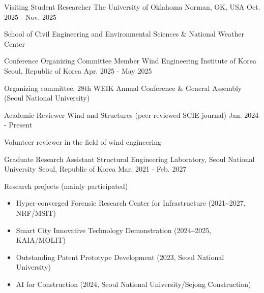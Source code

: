 

\begin{cventries}

  \cventrycompact
  {Visiting Student Researcher}
  {The University of Oklahoma}
  {Norman, OK, USA}
  {Oct. 2025 - Nov. 2025}
  {
    \begin{cvitems}
      \item {School of Civil Engineering and Environmental Sciences \& National Weather Center}
    \end{cvitems}
  }

  \cventrydivider

  \cventrycompact
  {Conference Organizing Committee Member}
  {Wind Engineering Institute of Korea}
  {Seoul, Republic of Korea}
  {Apr. 2025 - May 2025}
  {
    \begin{cvitems}
      \item {Organizing committee, 28th WEIK Annual Conference \& General Assembly (Seoul National University)}
    \end{cvitems}
  }

  \cventrydivider

  \cventrycompact
  {Academic Reviewer}
  {Wind and Structures (peer-reviewed SCIE journal)}
  {}
  {Jan. 2024 - Present}
  {
    \begin{cvitems}
      \item {Volunteer reviewer in the field of wind engineering}
    \end{cvitems}
  }

  \cventrydivider

  \cventrycompact
  {Graduate Research Assistant}
  {Structural Engineering Laboratory, Seoul National University}
  {Seoul, Republic of Korea}
  {Mar. 2021 - Feb. 2027}
  {
    \begin{cvitems}
      \item {Research projects (mainly participated)}
        \begin{itemize}[leftmargin=2.5ex, nosep, noitemsep]
          \setlength{\parskip}{0pt}
          \item {Hyper-converged Forensic Research Center for Infrastructure (2021\textasciitilde2027, NRF/MSIT)}
          \item {Smart City Innovative Technology Demonstration (2024\textasciitilde2025, KAIA/MOLIT)}
          \item {Outstanding Patent Prototype Development (2023, Seoul National University)}
          \item {AI for Construction (2024, Seoul National University/Sejong Construction)}
        \end{itemize}
    \end{cvitems}
  }


\end{cventries}
